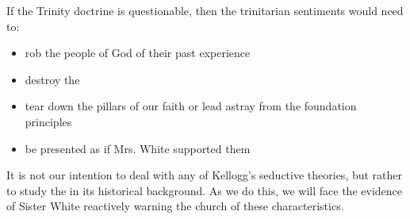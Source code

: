 If the Trinity doctrine is questionable, then the trinitarian sentiments would need to:
\begin{itemize}
    \item rob the people of God of their past experience
    \item destroy the 
    \item tear down the pillars of our faith or lead astray from the foundation principles
    \item be presented as if Mrs. White supported them
\end{itemize}

It is not our intention to deal with any of Kellogg’s seductive theories, but rather to study the  in its historical background. As we do this, we will face the evidence of Sister White reactively warning the church of these characteristics.